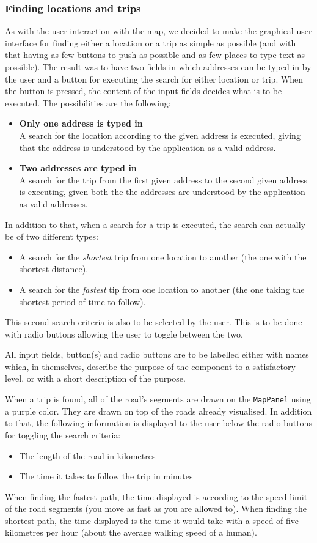 \subsubsection{Finding locations and trips}
As with the user interaction with the map, we decided to make the graphical user interface for finding either a location or a trip as simple as possible (and with that having as few buttons to push as possible and as few places to type text as possible). The result was to have two fields in which addresses can be typed in by the user and a button for executing the search for either location or trip. When the button is pressed, the content of the input fields decides what is to be executed. The possibilities are the following:
\begin{itemize}
	\item \textbf{Only one address is typed in} \\
		A search for the location according to the given address is executed, giving that the address is understood by the application as a valid address.
	\item \textbf{Two addresses are typed in} \\
		A search for the trip from the first given address to the second given address is executing, given both the the addresses are understood by the application as valid addresses.
\end{itemize}
In addition to that, when a search for a trip is executed, the search can actually be of two different types:
\begin{itemize}
	\item A search for the \textit{shortest} trip from one location to another (the one with the shortest distance).
	\item A search for the \textit{fastest} tip from one location to another (the one taking the shortest period of time to follow).
\end{itemize}
This second search criteria is also to be selected by the user. This is to be done with radio buttons allowing the user to toggle between the two.

All input fields, button(s) and radio buttons are to be labelled either with names which, in themselves, describe the purpose of the component to a satisfactory level, or with a short description of the purpose.

When a trip is found, all of the road's segments are drawn on the \texttt{MapPanel} using a purple color. They are drawn on top of the roads already visualised. In addition to that, the following information is displayed to the user below the radio buttons for toggling the search criteria:
\begin{itemize}
	\item The length of the road in kilometres
	\item The time it takes to follow the trip in minutes
\end{itemize}
When finding the fastest path, the time displayed is according to the speed limit of the road segments (you move as fast as you are allowed to). When finding the shortest path, the time displayed is the time it would take with a speed of five kilometres per hour (about the average walking speed of a human).

